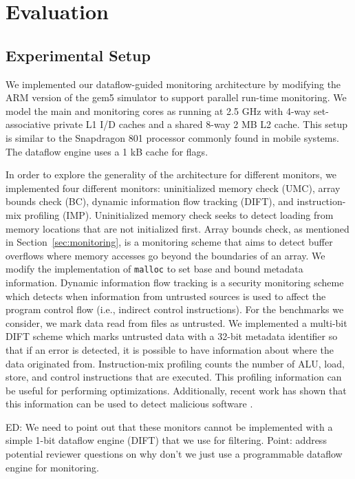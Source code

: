 \section{Evaluation}
\label{sec:evaluation}

\subsection{Experimental Setup}
\label{sec:evaluation.setup}

We implemented our dataflow-guided monitoring architecture by
modifying the ARM version of the gem5 simulator \cite{gem5} to support parallel
run-time monitoring. We model the main and monitoring cores as running at 2.5
GHz with 4-way set-associative private L1 I/D caches and a shared 8-way 2 MB L2
cache. This setup is similar to the Snapdragon 801 processor commonly found in
mobile systems. The dataflow engine uses a 1 kB cache for flags.

In order to explore the generality of the architecture for
different monitors, we implemented four different monitors: uninitialized
memory check (UMC), array bounds check (BC), dynamic information flow
tracking (DIFT), and instruction-mix profiling (IMP).  Uninitialized memory
check seeks to detect loading from
memory locations that are not initialized first. Array bounds check, as
mentioned in Section~\ref{sec:monitoring}, is a monitoring scheme that aims to
detect buffer overflows where memory accesses go beyond the boundaries of an
array. We modify the implementation of {\tt malloc} to set base and bound
metadata information. Dynamic information flow tracking is a security
monitoring scheme
which detects when information from untrusted sources is used to affect the
program control flow (i.e., indirect control instructions). For the benchmarks we consider, we mark data read from
files as untrusted. We implemented a multi-bit DIFT scheme which marks
untrusted data with a 32-bit metadata identifier so
that if an error is detected, it is possible to have information about where
the data originated from. Instruction-mix profiling counts the number of ALU,
load, store, and control instructions that are executed. This profiling
information can be useful for performing optimizations. Additionally, recent
work has shown that this information can be used to detect malicious software \cite{tang-raid14}.

ED: We need to point out that these monitors cannot be implemented with a simple
1-bit dataflow engine (DIFT) that we use for filtering. 
Point: address potential reviewer questions on why don't we just use a 
programmable dataflow engine for monitoring.

